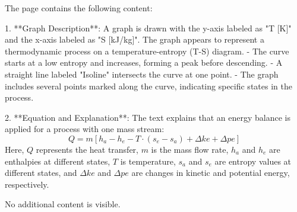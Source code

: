The page contains the following content:

1. **Graph Description**:  
   A graph is drawn with the y-axis labeled as "T [K]" and the x-axis labeled as "S [kJ/kg]". The graph appears to represent a thermodynamic process on a temperature-entropy (T-S) diagram.  
   - The curve starts at a low entropy and increases, forming a peak before descending.  
   - A straight line labeled "Isoline" intersects the curve at one point.  
   - The graph includes several points marked along the curve, indicating specific states in the process.  

2. **Equation and Explanation**:  
   The text explains that an energy balance is applied for a process with one mass stream:  
   \[
   Q = m \left[ h_a - h_e - T \cdot (s_e - s_a) + \Delta ke + \Delta pe \right]
   \]  
   Here, \( Q \) represents the heat transfer, \( m \) is the mass flow rate, \( h_a \) and \( h_e \) are enthalpies at different states, \( T \) is temperature, \( s_a \) and \( s_e \) are entropy values at different states, and \( \Delta ke \) and \( \Delta pe \) are changes in kinetic and potential energy, respectively.  

No additional content is visible.